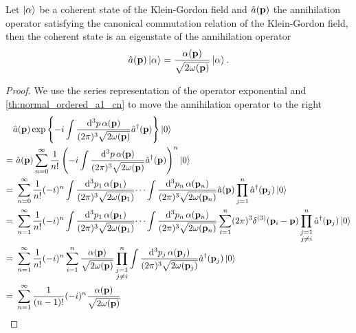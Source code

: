 \begin{theorem}
	Let $\ket{\alpha}$ be a coherent state of the Klein-Gordon field and $\hat{a}(\vb{p})$ the annihilation operator satisfying the canonical commutation relation of the Klein-Gordon field, then the coherent state is an eigenstate of the annihilation operator
	\begin{equation}
		\hat{a}(\vb{p})
		\ket{\alpha}
		=
		\frac{\alpha(\vb{p})}{\sqrt{2\omega(\vb{p})}}
		\ket{\alpha}
		.
	\end{equation}
\end{theorem}
\begin{proof}
	We use the series representation of the operator exponential and \cref{th:normal_ordered_a1_cn} to move the annihilation operator to the right
	\begin{equation*}
		\begin{split}
			&
			\hat{a}(\vb{p})
			\exp\left\{
				-i
				\int\frac{\dd[3]{p}\alpha(\vb{p})}{(2\pi)^3\sqrt{2\omega(\vb{p})}}
				\hat{a}^\dagger(\vb{p})
			\right\}
			\ket{0}
			\\
			=&\
			\hat{a}(\vb{p})
			\sum_{n=0}^\infty
			\frac{1}{n!}
			\left(
				-i
				\int\frac{\dd[3]{p}\alpha(\vb{p})}{(2\pi)^3\sqrt{2\omega(\vb{p})}}
				\hat{a}^\dagger(\vb{p})
			\right)^n
			\ket{0}
			\\
			=&\
			\sum_{n=0}^\infty
			\frac{1}{n!}
			(-i)^n
			\int\frac{\dd[3]{p_1}\alpha(\vb{p}_1)}{(2\pi)^3\sqrt{2\omega(\vb{p}_1)}}
			\dots
			\int\frac{\dd[3]{p_n}\alpha(\vb{p}_n)}{(2\pi)^3\sqrt{2\omega(\vb{p}_n)}}
			\hat{a}(\vb{p})
			\prod_{j=1}^n
			\hat{a}^\dagger(\vb{p}_j)
			\ket{0}
			\\
			=&\
			\sum_{n=1}^\infty
			\frac{1}{n!}
			(-i)^n
			\int\frac{\dd[3]{p_1}\alpha(\vb{p}_1)}{(2\pi)^3\sqrt{2\omega(\vb{p}_1)}}
			\dots
			\int\frac{\dd[3]{p_n}\alpha(\vb{p}_n)}{(2\pi)^3\sqrt{2\omega(\vb{p}_n)}}
			\sum_{i=1}^n
			(2\pi)^3
			\delta^{(3)}(\vb{p}_i-\vb{p})
			\prod_{\substack{j=1\\j\neq i}}^n
			\hat{a}^\dagger(\vb{p}_j)
			\ket{0}
			\\
			=&\
			\sum_{n=1}^\infty
			\frac{1}{n!}
			(-i)^n
			\sum_{i=1}^n
			\frac{\alpha(\vb{p})}{\sqrt{2\omega(\vb{p})}}
			\prod_{\substack{j=1\\j\neq i}}^n
			\int\frac{\dd[3]{p_j}\alpha(\vb{p}_j)}{(2\pi)^3\sqrt{2\omega(\vb{p}_j)}}
			\hat{a}^\dagger(\vb{p}_j)
			\ket{0}
			\\
			=&\
			\sum_{n=1}^\infty
			\frac{1}{(n-1)!}
			(-i)^n
			\frac{\alpha(\vb{p})}{\sqrt{2\omega(\vb{p})}}

\end{split}
\end{equation*}
\end{proof}
